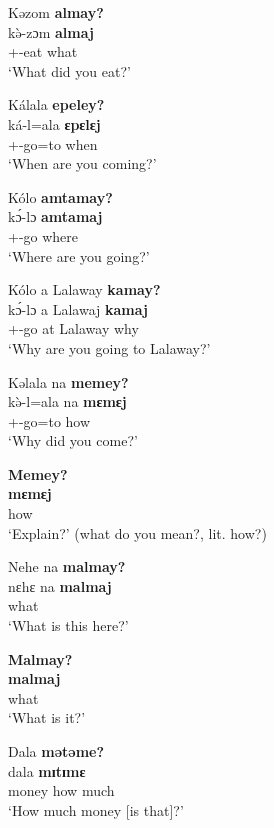 \ea \label{ex:3:28}
Kəzom  \textbf{almay?}\\
\gll  k\`{ə}-zɔm  \textbf{almaj}\\
      {\twoS}+\PFV-eat  what\\
\glt  ‘What did you eat?’
\z

\clearpage
\ea \label{ex:3:29}
Kálala  \textbf{epeley?}~\\
\gll  ká-l=ala     \textbf{ɛpɛlɛj}~\\
      {\twoS}+{\IFV}-go=to   when\\
\glt  ‘When are you coming?’
\z

\ea \label{ex:3:30}
Kólo  \textbf{amtamay?}~\\
\gll  k\'{ɔ}-lɔ     \textbf{amtamaj}\\
      {\twoS}+\IPV-go    where\\
\glt  ‘Where are you going?’
\z

\ea \label{ex:3:31}
Kólo  a  Lalaway  \textbf{kamay?}\\
\gll  k\'{ɔ}-lɔ   a  Lalawaj    \textbf{kamaj}\\
      {\twoS}+\IFV-go  at  Lalaway    why\\
\glt  ‘Why are you going to Lalaway?’
\z

\ea \label{ex:3:32}
Kəlala  na  \textbf{memey?}\\
\gll  k\`{ə}-l=ala  na  \textbf{mɛmɛj}\\
      {\twoS}+{\PFV}-go=to  {\PSP}  how\\
\glt  ‘Why  did you come?’
\z

\ea \label{ex:3:33}
\textbf{Memey?}\\
\gll  \textbf{mɛmɛj}\\
      how\\
\glt  ‘Explain?’ (what do you mean?, lit. how?)
\z

\ea \label{ex:3:34}
Nehe  na  \textbf{malmay?}\\
\gll  nɛhɛ   na   \textbf{malmaj}\\
      {\DEM}  {\PSP}  what\\
\glt  ‘What is this here?’
\z

\ea \label{ex:3:35}
\textbf{Malmay?}\\
\gll  \textbf{malmaj}\\
      what\\
\glt  ‘What is it?’
\z

\ea \label{ex:3:36}
Dala  \textbf{mətəme?}\\
\gll  dala    \textbf{mɪtɪmɛ}\\
      money  {how much}\\
\glt  ‘How much money [is that]?’
\z


